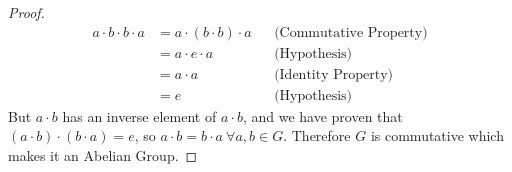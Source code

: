 \documentclass[12pt]{article}
\begin{document}
\begin{enumerate}[label=\textbf{\arabic*}.]
\begin{proof}
          \begin{align*}
            a \cdot b \cdot b \cdot a &= a \cdot (b \cdot b) \cdot a && \text{(Commutative Property)} \\
            &= a \cdot e \cdot a && \text{(Hypothesis)} \\
            &= a \cdot a && \text{(Identity Property)} \\
            &= e && \text{(Hypothesis)} 
          \end{align*}
          But $a \cdot b$ has an inverse element of $a \cdot b$, and we have proven that $(a \cdot b) \cdot (b \cdot a) = e$, 
          so $a \cdot b = b \cdot a \ \forall a,b \in G$. Therefore $G$ is commutative which makes it an Abelian Group.
        \end{proof}
\end{enumerate}
\end{document}
